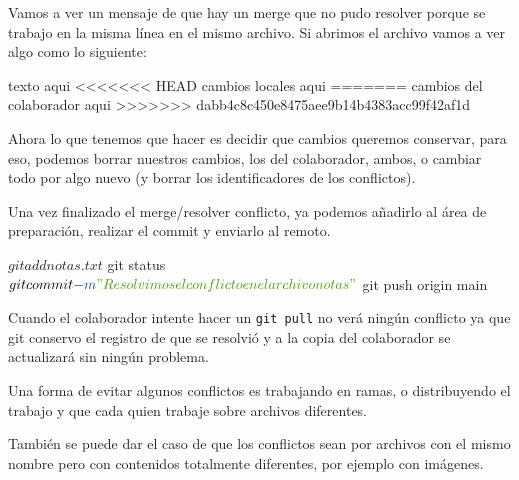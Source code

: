 \documentclass[
]{book}
\newenvironment{Shaded}{\begin{snugshade}}{\end{snugshade}}
\newcommand{\AttributeTok}[1]{\textcolor[rgb]{0.13,0.29,0.53}{#1}}
\newcommand{\ExtensionTok}[1]{#1}
\newcommand{\NormalTok}[1]{#1}
\newcommand{\StringTok}[1]{\textcolor[rgb]{0.31,0.60,0.02}{#1}}
\begin{document}
Vamos a ver un mensaje de que hay un merge que no pudo resolver porque se trabajo en la misma línea en el mismo archivo. Si abrimos el archivo vamos a ver algo como lo siguiente:

\begin{Shaded}
\begin{Highlighting}[]
\NormalTok{texto aqui}
\NormalTok{\textless{}\textless{}\textless{}\textless{}\textless{}\textless{}\textless{} HEAD}
\NormalTok{cambios locales aqui}
\NormalTok{=======}
\NormalTok{cambios del colaborador aqui}
\NormalTok{\textgreater{}\textgreater{}\textgreater{}\textgreater{}\textgreater{}\textgreater{}\textgreater{} dabb4c8c450e8475aee9b14b4383acc99f42af1d}
\end{Highlighting}
\end{Shaded}

Ahora lo que tenemos que hacer es decidir que cambios queremos conservar, para eso, podemos borrar nuestros cambios, los del colaborador, ambos, o cambiar todo por algo nuevo (y borrar los identificadores de los conflictos).

Una vez finalizado el merge/resolver conflicto, ya podemos añadirlo al área de preparación, realizar el commit y enviarlo al remoto.

\begin{Shaded}
\begin{Highlighting}[]
\ExtensionTok{$}\NormalTok{ git add notas.txt}
\ExtensionTok{$}\NormalTok{ git status}
\ExtensionTok{$}\NormalTok{ git commit }\AttributeTok{{-}m} \StringTok{"Resolvimos el conflicto en el archivo notas"}
\ExtensionTok{$}\NormalTok{ git push origin main}
\end{Highlighting}
\end{Shaded}

Cuando el colaborador intente hacer un \texttt{git\ pull} no verá ningún conflicto ya que git conservo el registro de que se resolvió y a la copia del colaborador se actualizará sin ningún problema.

\begin{Shaded}
\end{Shaded}

Una forma de evitar algunos conflictos es trabajando en ramas, o distribuyendo el trabajo y que cada quien trabaje sobre archivos diferentes.

También se puede dar el caso de que los conflictos sean por archivos con el mismo nombre pero con contenidos totalmente diferentes, por ejemplo con imágenes.
\end{document}
